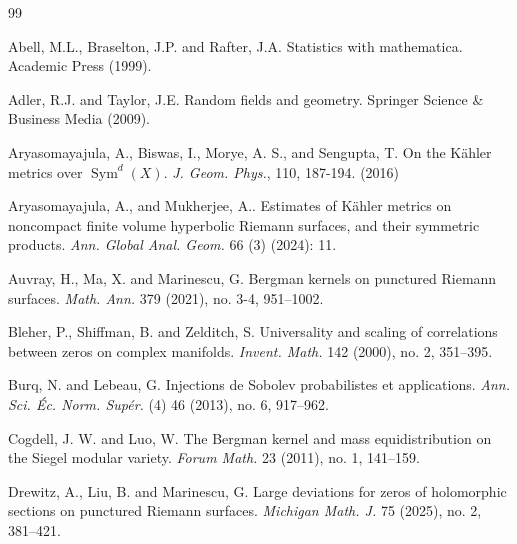 \documentclass[12pt, a4paper]{amsart}
\newcommand{\tmop}[1]{\ensuremath{\operatorname{#1}}}
\theoremstyle{definition}
\newcommand {\1} {\mathbf{1}}
\numberwithin{equation}{section}
\begin{document}
\begin{thebibliography}{99}


Abell, M.L., Braselton, J.P. and Rafter, J.A.
Statistics with mathematica.
Academic Press (1999).

Adler, R.J. and Taylor, J.E.
Random fields and geometry.
Springer Science \& Business Media (2009).

 Aryasomayajula, A., Biswas, I., Morye, A. S., and Sengupta, T.  On the Kähler metrics over $\tmop{Sym}^d(X)$. \emph{J. Geom. Phys.}, 110, 187-194. (2016)

 Aryasomayajula, A., and Mukherjee, A.. Estimates of Kähler metrics on noncompact finite volume hyperbolic Riemann surfaces, and their symmetric products. \emph{Ann. Global Anal. Geom.} 66 (3) (2024): 11.



Auvray, H., Ma, X. and Marinescu, G.
Bergman kernels on punctured Riemann surfaces.
\emph{Math. Ann.} 379 (2021), no. 3-4, 951--1002.



Bleher, P., Shiffman, B. and Zelditch, S.
Universality and scaling of correlations between zeros on complex manifolds.
\emph{Invent. Math.} 142 (2000), no. 2, 351--395.

Burq, N. and Lebeau, G.
Injections de Sobolev probabilistes et applications.
\emph{Ann. Sci. \'{E}c. Norm. Sup\'{e}r. }(4) 46
(2013), no. 6, 917--962.

Cogdell, J. W. and Luo, W.
The Bergman kernel and mass equidistribution on the Siegel modular variety.
\emph{Forum Math.} 23 (2011), no. 1, 141–159.

Drewitz, A., Liu, B. and Marinescu, G.
Large deviations for zeros of holomorphic sections on punctured Riemann surfaces.
\emph{Michigan Math. J.} 75 (2025), no. 2, 381--421.



\end{thebibliography}
\end{document}
